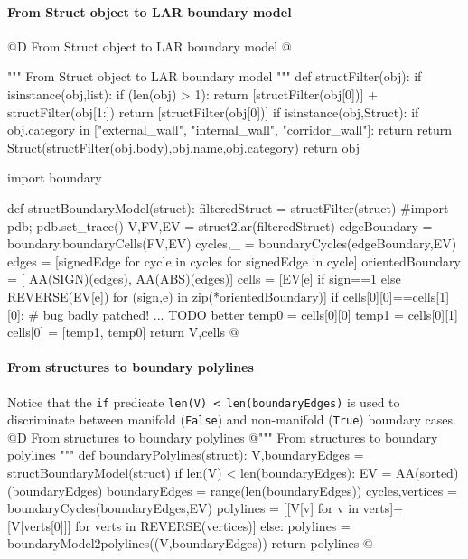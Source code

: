 \documentclass[11pt,oneside]{article}    %
\begin{document}
\paragraph{From Struct object to LAR boundary model}
@D From Struct object to LAR boundary model
@{""" From Struct object to LAR boundary model """
def structFilter(obj):
    if isinstance(obj,list):
        if (len(obj) > 1):
            return [structFilter(obj[0])] + structFilter(obj[1:])
        return [structFilter(obj[0])]
    if isinstance(obj,Struct):
        if obj.category in ["external_wall", "internal_wall", "corridor_wall"]:
            return
        return Struct(structFilter(obj.body),obj.name,obj.category)
    return obj

import boundary

def structBoundaryModel(struct):
    filteredStruct = structFilter(struct)
    #import pdb; pdb.set_trace()
    V,FV,EV = struct2lar(filteredStruct)
    edgeBoundary = boundary.boundaryCells(FV,EV)
    cycles,_ = boundaryCycles(edgeBoundary,EV)
    edges = [signedEdge for cycle in cycles for signedEdge in cycle]
    orientedBoundary = [ AA(SIGN)(edges), AA(ABS)(edges)]
    cells = [EV[e] if sign==1 else REVERSE(EV[e]) for (sign,e) in zip(*orientedBoundary)]
    if cells[0][0]==cells[1][0]: # bug badly patched! ... TODO better
        temp0 = cells[0][0]
        temp1 = cells[0][1]
        cells[0] = [temp1, temp0]
    return V,cells
@}



\paragraph{From structures to boundary polylines}
Notice that the \texttt{if} predicate \texttt{len(V) < len(boundaryEdges)} 
is used to discriminate between manifold (\texttt{False}) and non-manifold (\texttt{True})
boundary cases.
@D From structures to boundary polylines
@{""" From structures to boundary polylines """
def boundaryPolylines(struct):
    V,boundaryEdges = structBoundaryModel(struct)
    if len(V) < len(boundaryEdges):
        EV = AA(sorted)(boundaryEdges)
        boundaryEdges = range(len(boundaryEdges))
        cycles,vertices = boundaryCycles(boundaryEdges,EV)
        polylines = [[V[v] for v in verts]+[V[verts[0]]] for verts in REVERSE(vertices)]
    else:
        polylines = boundaryModel2polylines((V,boundaryEdges))
    return polylines
@}
\end{document}
